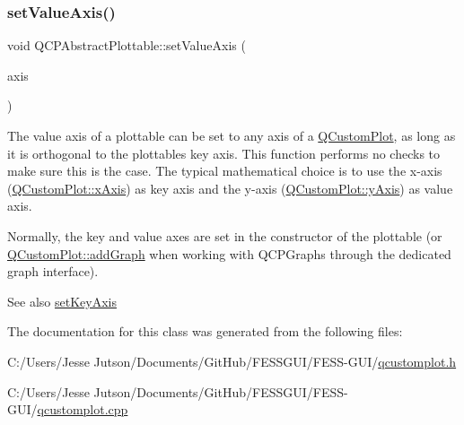 \subsubsection{\texorpdfstring{set\+Value\+Axis()}{setValueAxis()}}
{\footnotesize\ttfamily void Q\+C\+P\+Abstract\+Plottable\+::set\+Value\+Axis (\begin{DoxyParamCaption}\item[{\hyperlink{class_q_c_p_axis}{Q\+C\+P\+Axis} $\ast$}]{axis }\end{DoxyParamCaption})}

The value axis of a plottable can be set to any axis of a \hyperlink{class_q_custom_plot}{Q\+Custom\+Plot}, as long as it is orthogonal to the plottable\textquotesingle{}s key axis. This function performs no checks to make sure this is the case. The typical mathematical choice is to use the x-\/axis (\hyperlink{class_q_custom_plot_a9a79cd0158a4c7f30cbc702f0fd800e4}{Q\+Custom\+Plot\+::x\+Axis}) as key axis and the y-\/axis (\hyperlink{class_q_custom_plot_af6fea5679725b152c14facd920b19367}{Q\+Custom\+Plot\+::y\+Axis}) as value axis.

Normally, the key and value axes are set in the constructor of the plottable (or \hyperlink{class_q_custom_plot_a6fb2873d35a8a8089842d81a70a54167}{Q\+Custom\+Plot\+::add\+Graph} when working with Q\+C\+P\+Graphs through the dedicated graph interface).

\begin{DoxySeeAlso}{See also}
\hyperlink{class_q_c_p_abstract_plottable_a8524fa2994c63c0913ebd9bb2ffa3920}{set\+Key\+Axis} 
\end{DoxySeeAlso}


The documentation for this class was generated from the following files\+:\begin{DoxyCompactItemize}
\item 
C\+:/\+Users/\+Jesse Jutson/\+Documents/\+Git\+Hub/\+F\+E\+S\+S\+G\+U\+I/\+F\+E\+S\+S-\/\+G\+U\+I/\hyperlink{qcustomplot_8h}{qcustomplot.\+h}\item 
C\+:/\+Users/\+Jesse Jutson/\+Documents/\+Git\+Hub/\+F\+E\+S\+S\+G\+U\+I/\+F\+E\+S\+S-\/\+G\+U\+I/\hyperlink{qcustomplot_8cpp}{qcustomplot.\+cpp}\end{DoxyCompactItemize}
